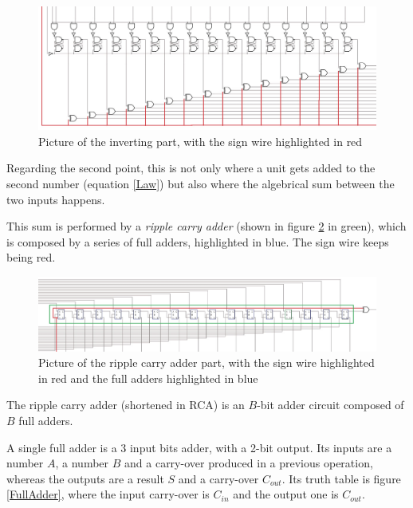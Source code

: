 \documentclass{article}
\begin{document}
\begin{figure}[h]
  \centering
  \includegraphics[scale=0.35]{SC_Processing1.JPG}
  \caption{Picture of the inverting part, with the sign wire highlighted in red}
  \label{Processing1}
\end{figure}

Regarding the second point, this is not only where a unit gets added to the second number (equation \ref{Law}) but also where the algebrical sum between the two inputs happens.

This sum is performed by a \textit{ripple carry adder} (shown in figure \ref{RCA} in green), which is composed by a series of full adders, highlighted in blue. The sign wire keeps being red.

\begin{figure}[h]
  \centering
  \includegraphics[scale=0.43]{SC_Processing2.JPG}
  \caption{Picture of the ripple carry adder part, with the sign wire highlighted in red and the full adders highlighted in blue}
  \label{RCA}
\end{figure}

The ripple carry adder (shortened in RCA) is an $B$-bit adder circuit composed of $B$ full adders. 

A single full adder is a 3 input bits adder, with a 2-bit output. Its inputs are a number $A$, a number $B$ and a carry-over produced in a previous operation, whereas the outputs are a result $S$ and a carry-over $C_{out}$. Its truth table is figure \ref{FullAdder}, where the input carry-over is $C_{in}$ and the output one is $C_{out}$.
\end{document}
